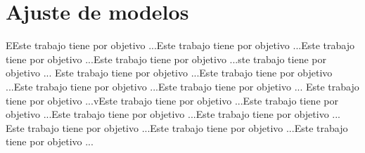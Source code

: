 \section{Ajuste de modelos}
EEste trabajo tiene por objetivo ...Este trabajo tiene por objetivo ...Este trabajo tiene por objetivo ...Este trabajo tiene por objetivo ...ste trabajo tiene por objetivo ...
Este trabajo tiene por objetivo ...Este trabajo tiene por objetivo ...Este trabajo tiene por objetivo ...Este trabajo tiene por objetivo ...
Este trabajo tiene por objetivo ...vEste trabajo tiene por objetivo ...Este trabajo tiene por objetivo ...Este trabajo tiene por objetivo ...Este trabajo tiene por objetivo ...
Este trabajo tiene por objetivo ...Este trabajo tiene por objetivo ...Este trabajo tiene por objetivo ...
